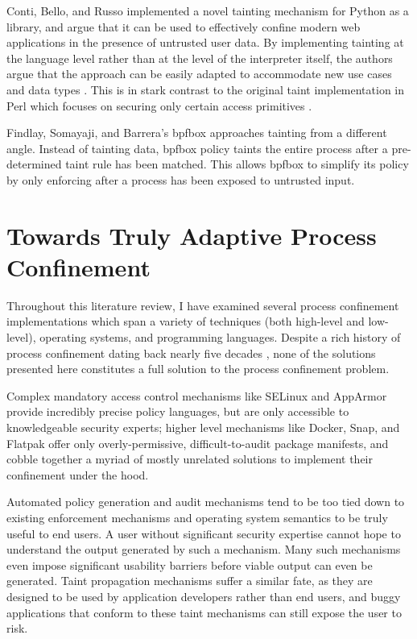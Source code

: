 \documentclass[dvipsnames, 12pt]{article}
\begin{document}
Conti, Bello, and Russo \cite{conti2010_taint,bello2012_taint} implemented
a novel tainting mechanism for Python as a library, and argue that it can be
used to effectively confine modern web applications in the presence of untrusted
user data. By implementing tainting at the language level rather than at the level
of the interpreter itself, the authors argue that the approach can be easily adapted
to accommodate new use cases and data types \cite{conti2010_taint, bello2012_taint}.
This is in stark contrast to the original taint implementation in Perl which
focuses on securing only certain access primitives \cite{hurst2004_perl}.


Findlay, Somayaji, and Barrera's bpfbox \cite{findlay20_bpfbox} approaches
tainting from a different angle.  Instead of tainting data, bpfbox policy taints
the entire process after a pre-determined taint rule has been matched. This
allows bpfbox to simplify its policy by only enforcing after a process has been
exposed to untrusted input.

\section{Towards Truly Adaptive Process Confinement}
\label{sec:towards}

Throughout this literature review, I have examined several process confinement
implementations which span a variety of techniques (both high-level and
low-level), operating systems, and programming languages. Despite a rich history
of process confinement dating back nearly five decades
\cite{lampson1973_a_note}, none of the solutions presented here constitutes
a full solution to the process confinement problem.

Complex mandatory access control mechanisms like SELinux
\cite{smalley2001_selinux} and AppArmor \cite{cowan2000_apparmor} provide
incredibly precise policy languages, but are only accessible to knowledgeable
security experts; higher level mechanisms like Docker, Snap, and Flatpak offer
only overly-permissive, difficult-to-audit package manifests, and cobble together
a myriad of mostly unrelated solutions to implement their confinement under the
hood.

Automated policy generation and audit mechanisms tend to be too tied down to
existing enforcement mechanisms and operating system semantics to be truly
useful to end users. A user without significant security expertise cannot hope
to understand the output generated by such a mechanism. Many such mechanisms
even impose significant usability barriers before viable output can even be
generated. Taint propagation mechanisms suffer a similar fate, as they are
designed to be used by application developers rather than end users, and buggy
applications that conform to these taint mechanisms can still expose the user to
risk.
\end{document}
